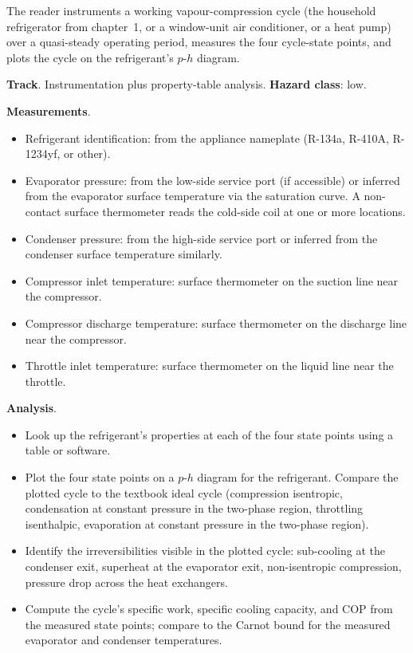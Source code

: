 \begin{project}
The reader instruments a working vapour-compression cycle (the
household refrigerator from chapter~1, or a window-unit air
conditioner, or a heat pump) over a quasi-steady operating period,
measures the four cycle-state points, and plots the cycle on the
refrigerant's $p$-$h$ diagram.

\textbf{Track}. Instrumentation plus property-table analysis.
\textbf{Hazard class}: low.

\textbf{Measurements}.

\begin{itemize}[leftmargin=*]
  \item Refrigerant identification: from the appliance nameplate
    (R-134a, R-410A, R-1234yf, or other).
  \item Evaporator pressure: from the low-side service port (if
    accessible) or inferred from the evaporator surface temperature
    via the saturation curve. A non-contact surface thermometer reads
    the cold-side coil at one or more locations.
  \item Condenser pressure: from the high-side service port or
    inferred from the condenser surface temperature similarly.
  \item Compressor inlet temperature: surface thermometer on the
    suction line near the compressor.
  \item Compressor discharge temperature: surface thermometer on the
    discharge line near the compressor.
  \item Throttle inlet temperature: surface thermometer on the
    liquid line near the throttle.
\end{itemize}

\textbf{Analysis}.

\begin{itemize}[leftmargin=*]
  \item Look up the refrigerant's properties at each of the four
    state points using a table or software.
  \item Plot the four state points on a $p$-$h$ diagram for the
    refrigerant. Compare the plotted cycle to the textbook ideal
    cycle (compression isentropic, condensation at constant pressure
    in the two-phase region, throttling isenthalpic, evaporation at
    constant pressure in the two-phase region).
  \item Identify the irreversibilities visible in the plotted cycle:
    sub-cooling at the condenser exit, superheat at the evaporator
    exit, non-isentropic compression, pressure drop across the heat
    exchangers.
  \item Compute the cycle's specific work, specific cooling capacity,
    and COP from the measured state points; compare to the Carnot
    bound for the measured evaporator and condenser temperatures.
\end{itemize}


\end{project}
